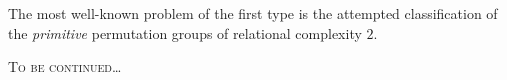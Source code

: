 \documentclass[11pt]{amsart}
\theoremstyle{plain}
\theoremstyle{definition}
\theoremstyle{remark}
\begin{document}
The most well-known problem of the first type is the attempted classification of the \emph{primitive} permutation groups of relational complexity $2$. 




\begin{center}
    \textsc{To be continued}\dots
\end{center}

\newpage



\end{document}
